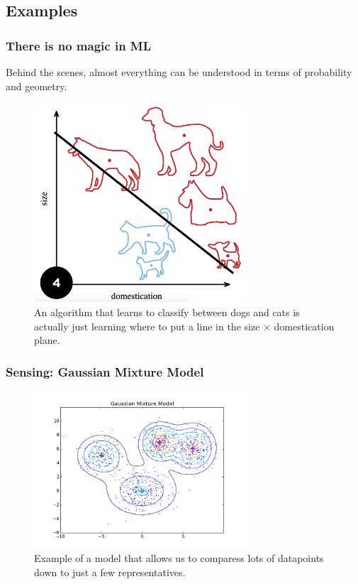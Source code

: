 \documentclass[10pt,mathserif]{beamer}
\begin{document}
\subsection{Examples}
\label{subsec:label}

\begin{frame}
  \frametitle{There is no magic in ML}
  Behind the scenes, almost everything can be understood in terms of probability
  and geometry.

  \begin{figure}[ht]
    \centering
    \includegraphics[width=0.7\textwidth]{figures/perceptron}
    \caption{An algorithm that learns to classify between dogs and cats is
      actually just learning where to put a line in the size $\times$
      domestication plane. \label{fig:perceptrong} }
  \end{figure}
\end{frame}

\begin{frame}
  \frametitle{Sensing: Gaussian Mixture Model}
 \begin{figure}[ht]
   \centering
   \includegraphics[width=0.7\textwidth]{figures/gmm}
   \caption{Example of a model that allows us to comparess lots of datapoints
     down to just a few representatives. \label{fig:gmm} }
 \end{figure}
\end{frame}
\end{document}
